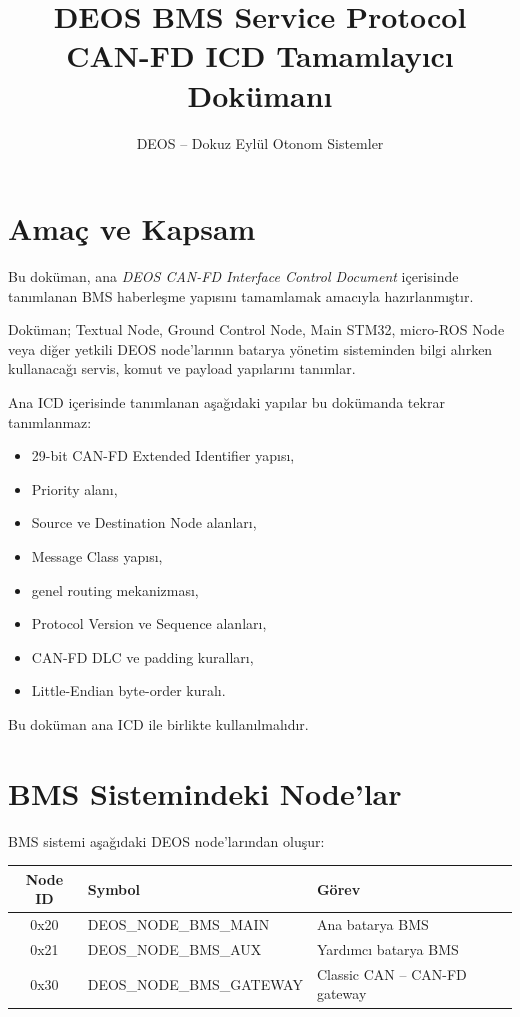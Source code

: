 \documentclass[a4paper,10pt]{article}
\title{\textbf{DEOS BMS Service Protocol}\\
\large CAN-FD ICD Tamamlayıcı Dokümanı}
\author{DEOS -- Dokuz Eylül Otonom Sistemler}
\date{}
\begin{document}
\maketitle

\section{Amaç ve Kapsam}

Bu doküman, ana \textit{DEOS CAN-FD Interface Control Document}
içerisinde tanımlanan BMS haberleşme yapısını tamamlamak amacıyla
hazırlanmıştır.

Doküman; Textual Node, Ground Control Node, Main STM32,
micro-ROS Node veya diğer yetkili DEOS node'larının batarya yönetim
sisteminden bilgi alırken kullanacağı servis, komut ve payload
yapılarını tanımlar.

Ana ICD içerisinde tanımlanan aşağıdaki yapılar bu dokümanda tekrar
tanımlanmaz:

\begin{itemize}[nosep]
    \item 29-bit CAN-FD Extended Identifier yapısı,
    \item Priority alanı,
    \item Source ve Destination Node alanları,
    \item Message Class yapısı,
    \item genel routing mekanizması,
    \item Protocol Version ve Sequence alanları,
    \item CAN-FD DLC ve padding kuralları,
    \item Little-Endian byte-order kuralı.
\end{itemize}

Bu doküman ana ICD ile birlikte kullanılmalıdır.

\section{BMS Sistemindeki Node'lar}

BMS sistemi aşağıdaki DEOS node'larından oluşur:

\begin{center}
\begin{tabular}{c l l}
\toprule
\textbf{Node ID} & \textbf{Symbol} & \textbf{Görev} \\
\midrule

0x20 &
DEOS\_NODE\_BMS\_MAIN &
Ana batarya BMS \\

0x21 &
DEOS\_NODE\_BMS\_AUX &
Yardımcı batarya BMS \\

0x30 &
DEOS\_NODE\_BMS\_GATEWAY &
Classic CAN -- CAN-FD gateway \\

\bottomrule
\end{tabular}
\end{center}
\end{document}

